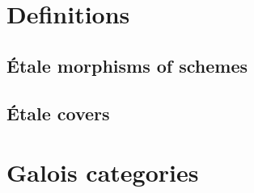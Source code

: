 
\section{Definitions}

\subsection{\'Etale morphisms of schemes}













\subsection{\'Etale covers}








\section{Galois categories}









